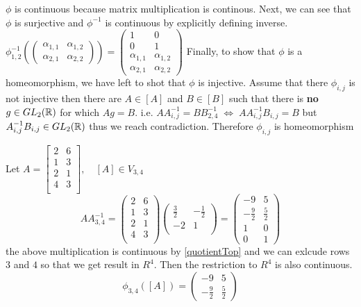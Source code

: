 \documentclass[11pt,a4paper]{report}
\begin{document}
$\phi$ is continuous because matrix multiplication is continous. Next, we can see that $\phi$ is surjective and $\phi^{-1}$ is continuous by explicitly defining inverse.
$\phi_{1,2}^{-1}(\begin{pmatrix} \alpha_{1,1} & \alpha_{1,2} \\ \alpha_{2,1} & \alpha_{2,2} \end{pmatrix}) =
\begin{pmatrix} 1 & 0 \\ 0 & 1 \\ \alpha_{1,1} & \alpha_{1,2} \\ \alpha_{2,1} & \alpha_{2,2} \end{pmatrix} $ Finally, to show that $\phi$ is a homeomorphism,
we have left to shot that $\phi$ is injective. 
\newline
Assume that there $\phi_{i,j}$ is not injective then there are $A \in [A]$ and $B \in [B]$ such that there is \textbf{no} $g \in GL_2(\mathbb{R})$
for which $A g =  B$. i.e. $A A_{i,j}^{-1} = B B_{2,4}^{-1} \; \iff  \; 
 A A_{i,j}^{-1} B_{i,j} = B$ but $A_{i,j}^{-1} B_{i,j} \in GL_2(\mathbb{R})$ thus we reach contradiction.
 Therefore $\phi_{i,j}$ is homeomorphism
\newline 
\begin{Ex} \label{ex1}
    Let $A = \begin{bmatrix}
        2 & 6 \\
        1 & 3 \\
        2 & 1 \\
        4 & 3 \\
    \end{bmatrix}, \quad [ A ] \in V_{3,4}$
    $$ A A_{3,4}^{-1} =  \begin{pmatrix} 2 & 6 \\ 1 & 3 \\ 2 & 1 \\ 4 & 3 \\ \end{pmatrix} \begin{pmatrix} \frac{3}{2} & -\frac{1}{2} \\ -2 & 1 \\ \end{pmatrix}
    = \begin{pmatrix} -9 & 5 \\ -\frac{9}{2} & \frac{5}{2} \\ 1 & 0 \\ 0 & 1 \end{pmatrix}
    $$
    the above multiplication is continuous by \ref{quotientTop} and we can exlcude rows $3$ and $4$ so that we get result in $R^4$.
    Then the restriction to $R^4$ is also continuous.
    $$ \phi_{3,4}([A]) = \begin{pmatrix} -9 & 5 \\ -\frac{9}{2} & \frac{5}{2} \end{pmatrix} $$
\end{Ex}
\end{document}
